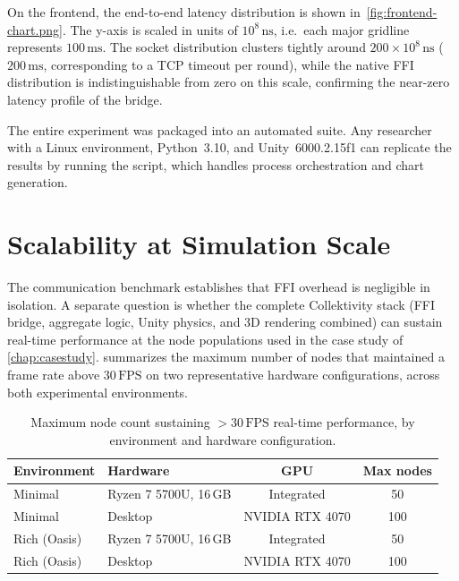 
On the frontend, the end-to-end latency distribution is shown in~\cref{fig:frontend-chart.png}. The y-axis is scaled in units of $10^8\,\text{ns}$, i.e.\ each major gridline represents $100\,\text{ms}$. The socket distribution clusters tightly around $200 \times 10^8\,\text{ns}$ ($200\,\text{ms}$, corresponding to a TCP timeout per round), while the native \ac{FFI} distribution is indistinguishable from zero on this scale, confirming the near-zero latency profile of the bridge.


The entire experiment was packaged into an automated suite. Any researcher with a Linux environment, Python~3.10, and Unity~6000.2.15f1 can replicate the results by running the  script, which handles process orchestration and chart generation.

\section{Scalability at Simulation Scale} \label{sec:scalability}

The communication benchmark establishes that \ac{FFI} overhead is negligible in isolation. A separate question is whether the complete Collektivity stack (\ac{FFI} bridge, aggregate logic, Unity physics, and 3D rendering combined) can sustain real-time performance at the node populations used in the case study of \cref{chap:casestudy}.  summarizes the maximum number of nodes that maintained a frame rate above $30\,\text{FPS}$ on two representative hardware configurations, across both experimental environments.

\begin{table}[ht]
    \centering
    \caption{Maximum node count sustaining $>30\,\text{FPS}$ real-time performance, by environment and hardware configuration.}
    \label{tab:scalability}
    \setlength{\tabcolsep}{8pt}
    \renewcommand{\arraystretch}{1.2}
    \begin{tabular}{llcc}
        \hline
        \textbf{Environment} & \textbf{Hardware} & \textbf{GPU} & \textbf{Max nodes} \\
        \hline
        Minimal & Ryzen 7 5700U, 16\,GB & Integrated & 50  \\
        Minimal & Desktop                     & NVIDIA RTX 4070 & 100 \\
        Rich (Oasis) & Ryzen 7 5700U, 16\,GB & Integrated & 50  \\
        Rich (Oasis) & Desktop                     & NVIDIA RTX 4070 & 100 \\
        \hline
    \end{tabular}
\end{table}

